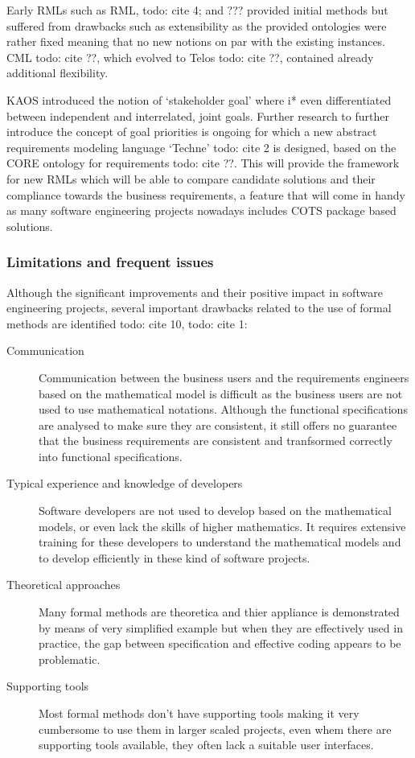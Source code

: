 Early RMLs such as RML, todo: cite 4; and ??? provided initial methods but suffered from drawbacks such as extensibility as the provided ontologies were rather fixed meaning that no new notions on par with the existing instances. CML todo: cite ??, which evolved to Telos todo: cite ??, contained already additional flexibility. 

KAOS introduced the notion of `stakeholder goal' where i* even differentiated between independent and interrelated, joint goals.
Further research to further introduce the concept of goal priorities is ongoing for which a new abstract requirements modeling language `Techne' todo: cite 2 is designed, based on the CORE ontology for requirements todo: cite ??. This will provide the framework for new RMLs which will be able to compare candidate solutions and their compliance towards the business requirements, a feature that will come in handy as many software engineering projects nowadays includes COTS package based solutions.

\subsubsection{Limitations and frequent issues}
Although the significant improvements and their positive impact in software engineering projects, several important drawbacks related to the use of formal methods are identified todo: cite 10, todo: cite 1:
\begin{description}
	\item[Communication] Communication between the business users and the requirements engineers based on the mathematical model is difficult as the business users are not used to use mathematical notations. Although the functional specifications are analysed to make sure they are consistent, it still offers no guarantee that the business requirements are consistent and tranfsormed correctly into functional specifications.
	\item[Typical experience and knowledge of developers] Software developers are not used to develop based on the mathematical models, or even lack the skills of higher mathematics. It requires extensive training for these developers to understand the mathematical models and to develop efficiently in these kind of software projects.
	\item[Theoretical approaches] Many formal methods are theoretica and thier appliance is demonstrated by means of very simplified example but when they are effectively used in practice, the gap between specification and effective coding appears to be problematic.
	\item[Supporting tools] Most formal methods don't have supporting tools making it very cumbersome to use them in larger scaled projects, even whem there are supporting tools available, they often lack a suitable user interfaces.
\end{description}



